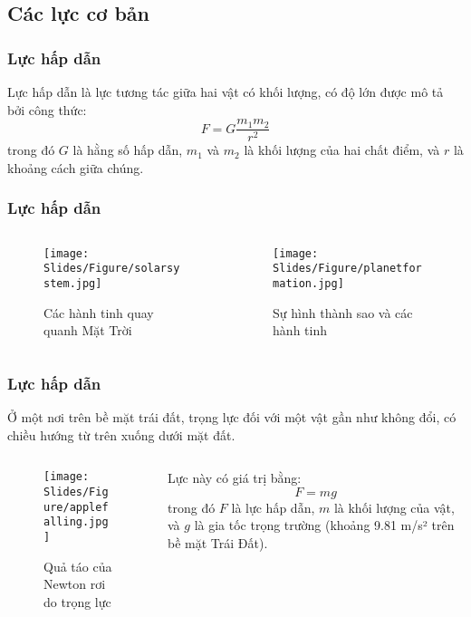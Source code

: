 \subsection{Các lực cơ bản}

\begin{frame}
    \frametitle{Lực hấp dẫn}
    \begin{tcolorbox}[colback=blue!10, colframe=blue!50!black, title=Định luật vạn vật hấp dẫn]
    Lực hấp dẫn là lực tương tác giữa hai vật có khối lượng, có độ lớn được mô tả bởi công thức:
    \begin{equation}
        F = G \frac{m_1 m_2}{r^2}
    \end{equation}
    trong đó \(G\) là hằng số hấp dẫn, \(m_1\) và \(m_2\) là khối lượng của hai chất điểm, và \(r\) là khoảng cách giữa chúng.
    \end{tcolorbox}
\end{frame}

\begin{frame}
    \frametitle{Lực hấp dẫn}
    \begin{columns}
    \begin{column}{0.5\textwidth}
        \begin{figure}
        \centering
        \texttt{[image: Slides/Figure/solarsystem.jpg]}
        \caption{Các hành tinh quay quanh Mặt Trời}
        \end{figure}
    \end{column}
    \begin{column}{0.5\textwidth}
        \begin{figure}
        \centering
        \texttt{[image: Slides/Figure/planetformation.jpg]}
        \caption{Sự hình thành sao và các hành tinh}
        \end{figure}
    \end{column}
    \end{columns}
\end{frame}

\begin{frame}
    \frametitle{Lực hấp dẫn}
    Ở một nơi trên bề mặt trái đất, trọng lực đối với một vật gần như không đổi, có chiều hướng từ trên xuống dưới mặt đất.
    \begin{columns}
    \begin{column}{0.5\textwidth}
        \begin{figure}
        \centering
        \texttt{[image: Slides/Figure/applefalling.jpg]}
        \caption{Quả táo của Newton rơi do trọng lực}
        \end{figure}
    \end{column}
    \begin{column}{0.5\textwidth}
        Lực này có giá trị bằng:
        \begin{equation}
            F=mg
        \end{equation}
        trong đó \(F\) là lực hấp dẫn, \(m\) là khối lượng của vật, và \(g\) là gia tốc trọng trường (khoảng 9.81 m/s² trên bề mặt Trái Đất).
    \end{column}
    \end{columns}
\end{frame}

